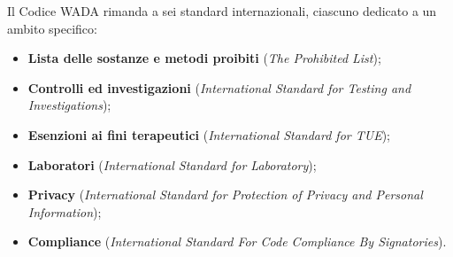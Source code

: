 Il Codice WADA rimanda a sei standard internazionali, ciascuno dedicato a un ambito specifico:
\begin{itemize}
  \item \textbf{Lista delle sostanze e metodi proibiti} (\textit{The Prohibited List});
  \item \textbf{Controlli ed investigazioni} (\textit{International Standard for Testing and
    Investigations});
  \item \textbf{Esenzioni ai fini terapeutici} (\textit{International Standard for TUE});
  \item \textbf{Laboratori} (\textit{International Standard for Laboratory});
  \item \textbf{Privacy} (\textit{International Standard for Protection of Privacy and Personal
    Information});
  \item \textbf{Compliance} (\textit{International Standard For Code Compliance By
    Signatories}).
\end{itemize}
